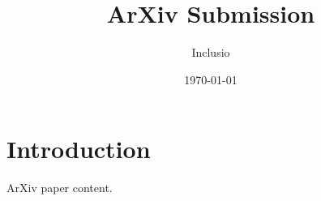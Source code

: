 \documentclass[final,tagged]{pub-arxiv}
\title{ArXiv Submission}
\author{Inclusio}
\date{\today}
\begin{document}
\section{Introduction}
ArXiv paper content.
\end{document}
